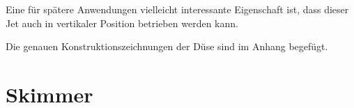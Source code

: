 Eine für spätere Anwendungen vielleicht interessante Eigenschaft ist, dass dieser Jet auch in vertikaler Position betrieben werden kann.

Die genauen Konstruktionszeichnungen der Düse sind im Anhang begefügt.
%
%



\section{Skimmer} \label{sec:Skimmer}


